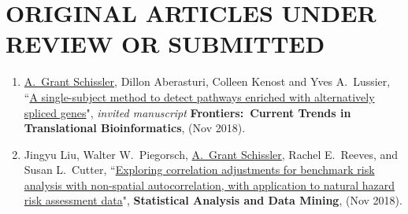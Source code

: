 \documentclass[paper=a4,fontsize=11pt]{scrartcl} %
\newcommand{\NewPart}[2]{\section*{\uppercase{#1} #2 }}
\newcommand{\PaperEntry}[7]{
		\noindent #1, ``\href{#7}{#2}", \textit{#3} \textbf{#4}, #5 (#6).}
\begin{document}

\NewPart{Original articles under review or submitted}{}
\vspace{-7pt}
\begin{enumerate}

\item \PaperEntry{\underline{A.~Grant Schissler}, Dillon Aberasturi, Colleen Kenost and Yves A.~Lussier}{A single-subject method to detect pathways enriched with alternatively spliced genes}{invited manuscript}{Frontiers:~Current Trends in Translational Bioinformatics}{}{Nov 2018}{}

\item \PaperEntry{Jingyu Liu, Walter W.~Piegorsch, \underline{A.~Grant Schissler}, Rachel E.~Reeves, and Susan L.~Cutter}{Exploring correlation adjustments for benchmark risk analysis with non-spatial autocorrelation, with  application to natural hazard risk assessment data}{}{Statistical Analysis and Data Mining}{}{Nov 2018}{}

  
\end{enumerate}


\end{document}

